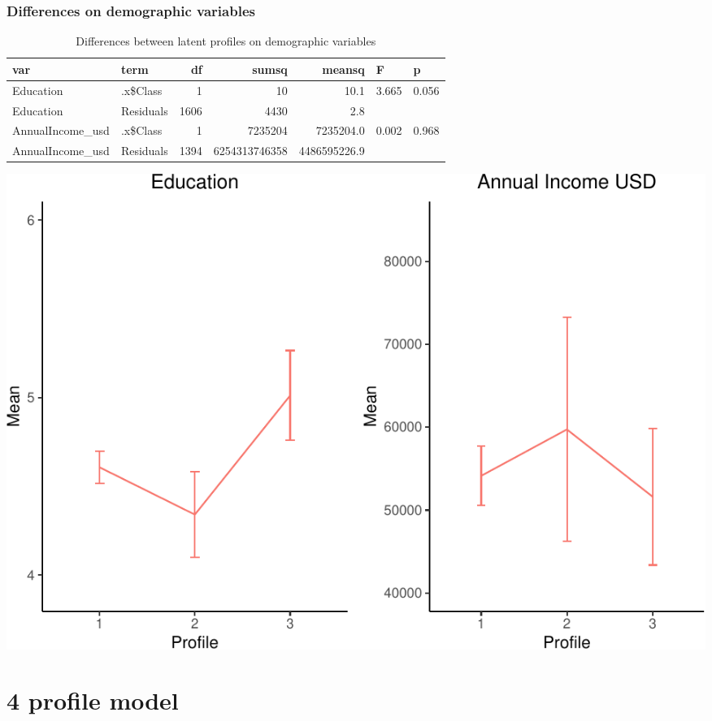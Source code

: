 \documentclass[]{article}
\begin{document}
\hypertarget{differences-on-demographic-variables-1}{%
\subsubsection{Differences on demographic
variables}\label{differences-on-demographic-variables-1}}

\begin{table}[H]

\caption{\label{tab:unnamed-chunk-14}Differences between latent profiles on demographic variables}
\centering
\fontsize{6}{8}\selectfont
\begin{tabular}[t]{llrrrll}
\toprule
var & term & df & sumsq & meansq & F & p\\
\midrule
Education & .x\$Class & 1 & 10 & 10.1 & 3.665 & 0.056\\
Education & Residuals & 1606 & 4430 & 2.8 &  & \\
AnnualIncome\_usd & .x\$Class & 1 & 7235204 & 7235204.0 & 0.002 & 0.968\\
AnnualIncome\_usd & Residuals & 1394 & 6254313746358 & 4486595226.9 &  & \\
\bottomrule
\end{tabular}
\end{table}

\includegraphics{lpa_analyses_files/figure-latex/unnamed-chunk-14-1.pdf}

\newpage

\hypertarget{profile-model-2}{%
\section{4 profile model}\label{profile-model-2}}
\end{document}
